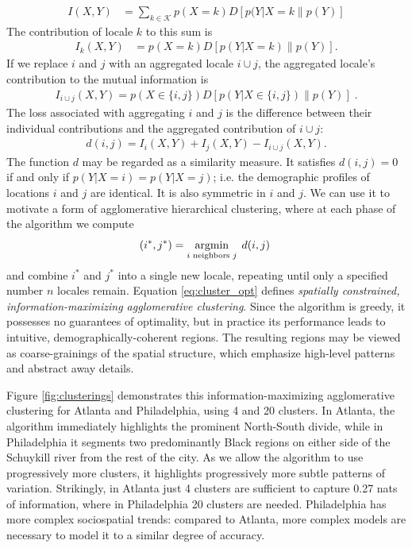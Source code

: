 \documentclass[9pt,twocolumn,twoside]{pnas-new}
\begin{document}
	\begin{align*}
	 	I(X,Y) &= \sum_{k \in \mathcal{K}} p(X = k) D[p(Y|X = k\|p(Y)] 
	\end{align*} 
	The contribution of locale $k$ to this sum is 
	\begin{align*}
		I_{k}(X,Y) &= p(X = k)D[p(Y|X = k)\|p(Y)]. 
	\end{align*}
	If we replace $i$ and $j$ with an aggregated locale $i\cup j$, the aggregated locale's contribution to the mutual information is 
	\begin{align*}
		I_{i\cup j}(X,Y) = p(X \in \{i,j\}) D[p(Y|X \in \{i,j\}) \| p(Y)]\;.
	\end{align*}
	The loss associated with aggregating $i$ and $j$ is the difference between their individual contributions and the aggregated contribution of $i\cup j$:
	\begin{align*}
		d(i,j) = I_{i}(X,Y) + I_{j}(X,Y) - I_{i \cup j}(X,Y).  
	\end{align*}
	The function $d$ may be regarded as a similarity measure. It satisfies $d(i,j) = 0$ if and only if $p(Y|X = i) = p(Y|X = j)$; i.e. the demographic profiles of locations $i$ and $j$ are identical. It is also symmetric in $i$ and $j$. We can use it to motivate a form of agglomerative hierarchical clustering, where at each phase of the algorithm we compute 
	\begin{equation}
		(i^*, j^*) = \argmin_{i \text{ neighbors } j} \; d(i,j)\; \label{eq:cluster_opt}
	\end{equation}
	and combine $i^*$ and $j^*$ into a single new locale, repeating until only a specified number $n$ locales remain. 
	Equation \eqref{eq:cluster_opt} defines \emph{spatially constrained, information-maximizing agglomerative clustering}. 
	Since the algorithm is greedy, it possesses no guarantees of optimality, but in practice its performance leads to intuitive, demographically-coherent regions. 
	The resulting regions may be viewed as coarse-grainings of the spatial structure, which emphasize high-level patterns and abstract away details. 

	Figure \ref{fig:clusterings} demonstrates this information-maximizing agglomerative clustering for Atlanta and Philadelphia, using 4 and 20 clusters. In Atlanta, the algorithm immediately highlights the prominent North-South divide, while in Philadelphia it segments two predominantly Black regions on either side of the Schuykill river from the rest of the city. As we allow the algorithm to use progressively more clusters, it highlights progressively more subtle patterns of variation. Strikingly, in Atlanta just 4 clusters are sufficient to capture 0.27 nats of information, where in Philadelphia 20 clusters are needed. Philadelphia has more complex sociospatial trends: compared to Atlanta, more complex models are necessary to model it to a similar degree of accuracy. 
	
\end{document}
